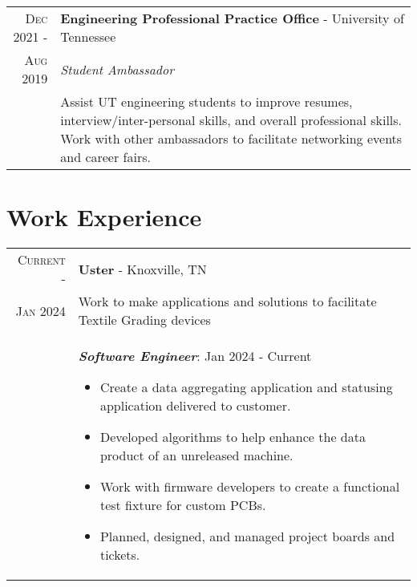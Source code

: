 \documentclass[a4paper,12pt]{article}
\begin{document}
\begin{tabularx}{\textwidth}{r|X}

   \textsc{Dec 2021 \--} & \textbf{Engineering Professional Practice Office} \-- University of Tennessee\\
   \textsc{Aug 2019} & \emph{Student Ambassador}\\
   & \small{Assist UT engineering students to improve resumes, interview/inter-personal skills, and overall professional skills.
            Work with other ambassadors to facilitate networking events and career fairs.
   }\\

\end{tabularx}

\section{Work Experience}

%
%
\begin{tabularx}{\textwidth}{r|X}
   \textsc{Current \--} & \textbf{Uster} \-- Knoxville, TN\\
   \textsc{Jan 2024} & \small{Work to make applications and solutions to facilitate Textile Grading devices} \\
   & \emph{\textbf{Software Engineer}}: Jan 2024 \-- Current
   \begin{itemize}[leftmargin=20pt,topsep=1pt,itemsep=1pt,partopsep=0pt, parsep=1pt]
        \item Create a data aggregating application and statusing application delivered to customer.
        \item Developed algorithms to help enhance the data product of an unreleased machine.
        \item Work with firmware developers to create a functional test fixture for custom PCBs.
        \item Planned, designed, and managed project boards and tickets.
    \end{itemize}\\
\end{tabularx}
\end{document}
